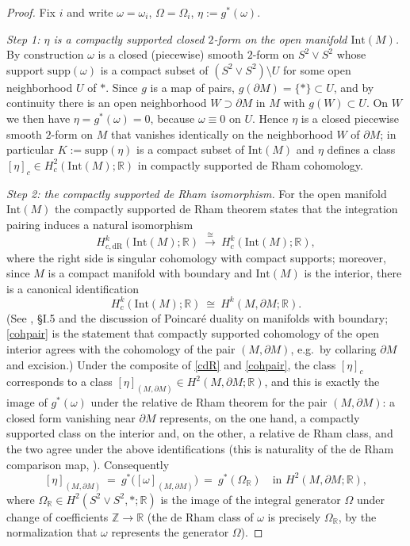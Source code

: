 \documentclass{amsart}
\newtheorem*{theorem 1}{Theorem 1}
\newtheorem*{theorem 2}{Theorem 2}
\newtheorem*{theorem 3}{Theorem 3}
\numberwithin{equation}{section}
\newcommand{\RR}{\mathbb{R}}
\newcommand{\ZZ}{\mathbb{Z}}
\begin{document}
\begin{proof}
Fix $i$ and write $\omega=\omega_i$, $\Omega=\Omega_i$,
$\eta:=g^*(\omega)$.

\emph{Step 1: $\eta$ is a compactly supported closed $2$-form on the
open manifold $\mathrm{Int}(M)$.}  By construction $\omega$ is a
closed (piecewise) smooth $2$-form on $S^2\vee S^2$ whose support
$\mathrm{supp}(\omega)$ is a compact subset of $(S^2\vee S^2)\setminus
U$ for some open neighborhood $U$ of $*$.  Since $g$ is a map of pairs,
$g(\partial M)=\{*\}\subset U$, and by continuity there is an open
neighborhood $W\supset\partial M$ in $M$ with $g(W)\subset U$.  On $W$
we then have $\eta=g^*(\omega)=0$, because $\omega\equiv 0$ on $U$.
Hence $\eta$ is a closed piecewise smooth $2$-form on $M$ that
vanishes identically on the neighborhood $W$ of $\partial M$; in
particular $K:=\mathrm{supp}(\eta)$ is a compact subset of
$\mathrm{Int}(M)$ and $\eta$ defines a class
$[\eta]_c\in H^2_c(\mathrm{Int}(M);\RR)$ in compactly supported de
Rham cohomology.

\emph{Step 2: the compactly supported de Rham isomorphism.}  For the
open manifold $\mathrm{Int}(M)$ the compactly supported de Rham theorem
states that the integration pairing induces a natural isomorphism
\begin{equation}\label{cdR}
 H^k_{c,\mathrm{dR}}(\mathrm{Int}(M);\RR)\ \xrightarrow{\ \cong\ }\
 H^k_c(\mathrm{Int}(M);\RR),
\end{equation}
where the right side is singular cohomology with compact supports;
moreover, since $M$ is a compact manifold with boundary and
$\mathrm{Int}(M)$ is the interior, there is a canonical identification
\begin{equation}\label{cohpair}
 H^k_c(\mathrm{Int}(M);\RR)\ \cong\ H^k(M,\partial M;\RR).
\end{equation}
(See \cite{BT}, \S{}I.5 and the discussion of Poincar\'e duality on
manifolds with boundary; \eqref{cohpair} is the statement that
compactly supported cohomology of the open interior agrees with the
cohomology of the pair $(M,\partial M)$, e.g.\ by collaring
$\partial M$ and excision.)  Under the composite of \eqref{cdR} and
\eqref{cohpair}, the class $[\eta]_c$ corresponds to a class
$[\eta]_{(M,\partial M)}\in H^2(M,\partial M;\RR)$, and this is exactly
the image of $g^*(\omega)$ under the relative de Rham theorem for the
pair $(M,\partial M)$: a closed form vanishing near $\partial M$
represents, on the one hand, a compactly supported class on the
interior and, on the other, a relative de Rham class, and the two
agree under the above identifications (this is naturality of the de
Rham comparison map, \cite{BT}).  Consequently
\begin{equation}\label{repr}
 [\eta]_{(M,\partial M)} \ =\ g^*\big([\omega]_{(M,\partial M)}\big)
   \ =\ g^*(\Omega_\RR) \quad\text{in } H^2(M,\partial M;\RR),
\end{equation}
where $\Omega_\RR\in H^2(S^2\vee S^2,*;\RR)$ is the image of the
integral generator $\Omega$ under change of coefficients
$\ZZ\to\RR$ (the de Rham class of $\omega$ is precisely $\Omega_\RR$,
by the normalization that $\omega$ represents the generator $\Omega$).


\end{proof}
\end{document}
